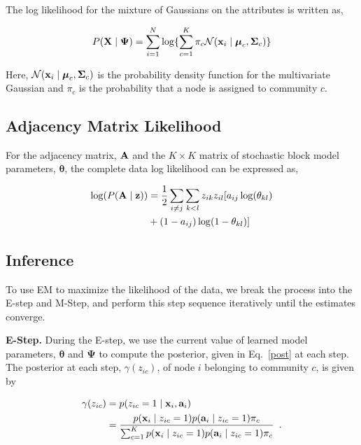 The log likelihood for the mixture of Gaussians on the attributes is written as,

\begin{equation}
P({\bf X} \mid {\boldsymbol \Psi})=\sum_{i=1}^{N}\log\{\sum_{c=1}^{K}\pi_{c}\mathcal{N}({\bf x}_{i}\mid {\boldsymbol \mu}_{c},{\boldsymbol \Sigma}_{c})   \}
\end{equation}

Here, $\mathcal{N}({\bf x}_{i} \mid {\boldsymbol \mu}_{c},{\boldsymbol \Sigma}_{c})$ is the probability density function for the multivariate Gaussian and $\pi_{c}$ is the probability that a node is assigned to community $c$.

\subsection{Adjacency Matrix Likelihood}
For the adjacency matrix, ${\bf A}$ and the $K \times K$ matrix of stochastic block model parameters, ${\boldsymbol \theta}$, the complete data log likelihood can be expressed as,

\begin{equation}
\begin{split}
\log(P({\bf A} \mid {\bf z}))&=\frac{1}{2}\sum_{i\ne j}\sum_{k< l}z_{ik}z_{il}[a_{ij}\log (\theta_{kl})\\
&+(1-a_{ij})\log(1-\theta_{kl})]
\end{split}
\end{equation}

\subsection{Inference}
To use EM to maximize the likelihood of the data, we break the process into the E-step and M-Step, and perform this step sequence iteratively until the estimates converge.

\textbf{E-Step.} During the E-step, we use the current value of learned model parameters, ${\boldsymbol \theta}$ and ${\boldsymbol \Psi}$ to compute the posterior, given in Eq.~\eqref{post} at each step. The posterior at each step,  $\gamma(z_{ic})$, of node $i$ belonging to community $c$, is given by

\begin{equation}
\begin{split}
\gamma({z_{ic}})& =p(z_{ic}=1\mid {\bf x}_{i}, {\bf a}_{i}) \\
&=\frac{p({\bf x}_{i} \mid z_{ic}=1)p({\bf a}_{i}\mid z_{ic}=1)\pi_{c}}{\sum_{c=1}^{K}p({\bf x}_{i} \mid z_{ic}=1)p({\bf a}_{i}\mid z_{ic}=1)\pi_{c}}\enspace.
\end{split}
\end{equation}

